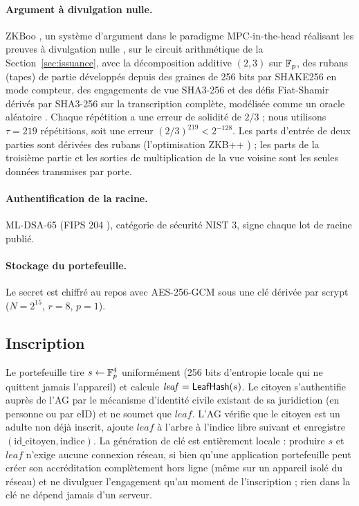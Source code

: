 \documentclass[11pt]{article}
\theoremstyle{definition}
\begin{document}
\paragraph{Argument à divulgation nulle.} ZKBoo \cite{zkboo}, un système d'argument dans
le paradigme MPC-in-the-head \cite{ikos} réalisant les preuves à divulgation nulle
\cite{gmr}, sur le circuit arithmétique de la Section~\ref{sec:issuance}, avec la
décomposition additive $(2,3)$ sur $\mathbb{F}_p$, des rubans (tapes) de partie développés depuis
des graines de 256 bits par SHAKE256 en mode compteur, des engagements de vue SHA3-256 et
des défis Fiat-Shamir dérivés par SHA3-256 sur la transcription complète, modélisée comme
un oracle aléatoire \cite{bellrog}. Chaque répétition a une erreur de solidité de $2/3$ ;
nous utilisons $\tau = 219$ répétitions, soit une erreur $(2/3)^{219} < 2^{-128}$. Les
parts d'entrée de deux parties sont dérivées des rubans (l'optimisation ZKB++
\cite{picnic}) ; les parts de la troisième partie et les sorties de multiplication de la
vue voisine sont les seules données transmises par porte.

\paragraph{Authentification de la racine.} ML-DSA-65 (FIPS 204 \cite{fips204}), catégorie
de sécurité NIST 3, signe chaque lot de racine publié.

\paragraph{Stockage du portefeuille.} Le secret est chiffré au repos avec AES-256-GCM sous
une clé dérivée par scrypt ($N = 2^{15}$, $r = 8$, $p = 1$).

\subsection{Inscription}

Le portefeuille tire $s \leftarrow \mathbb{F}_p^4$ uniformément (256 bits d'entropie locale qui ne
quittent jamais l'appareil) et calcule $\mathit{leaf} = \mathsf{LeafHash}(s)$. Le citoyen
s'authentifie auprès de l'AG par le mécanisme d'identité civile existant de sa juridiction
(en personne ou par eID) et ne soumet que $\mathit{leaf}$. L'AG vérifie que le citoyen est
un adulte non déjà inscrit, ajoute $\mathit{leaf}$ à l'arbre à l'indice libre suivant et
enregistre $(\mathrm{id\_citoyen}, \mathrm{indice})$. La génération de clé est entièrement
locale : produire $s$ et $\mathit{leaf}$ n'exige aucune connexion réseau, si bien qu'une
application portefeuille peut créer son accréditation complètement hors ligne (même sur un
appareil isolé du réseau) et ne divulguer l'engagement qu'au moment de l'inscription ;
rien dans la clé ne dépend jamais d'un serveur.
\end{document}

